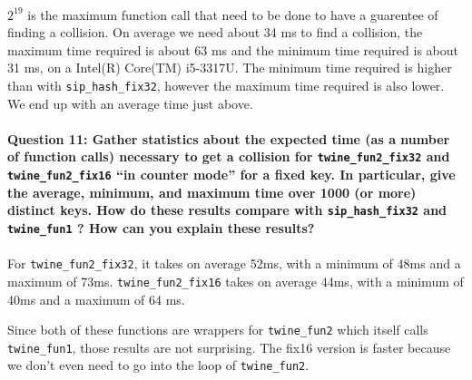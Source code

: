 \documentclass[4apaper]{report}
\begin{document}
\paragraph{} $2^{19}$ is the maximum function call that need to be done to have a guarentee of finding a collision. On average we need about 34 ms to find a collision, the maximum time required is about 63 ms and the minimum time required is about 31 ms, on a Intel(R) Core(TM) i5-3317U. The minimum time required is higher than with \texttt{sip\_hash\_fix32}, however the maximum time required is also lower. We end up with an average time just above.

\paragraph{Question 11: Gather statistics about the expected time (as a number of function calls) necessary to get a
collision for \texttt{twine\_fun2\_fix32} and \texttt{twine\_fun2\_fix16} “in counter mode” for a fixed key. In particular, give the average, minimum, and maximum time over 1000 (or more) distinct keys. How do these results compare with \texttt{sip\_hash\_fix32} and \texttt{twine\_fun1} ? How can you explain these results?}

\paragraph{} For \texttt{twine\_fun2\_fix32}, it takes on average 52ms, with a minimum of 48ms and a maximum of 73ms.
\texttt{twine\_fun2\_fix16} takes on average 44ms, with a minimum of 40ms and a maximum of 64 ms. 

Since both of these functions are wrappers for \texttt{twine\_fun2} which itself calls \texttt{twine\_fun1}, those results are not surprising. The fix16 version is faster because we don't even need to go into the loop of \texttt{twine\_fun2}.
\end{document}
